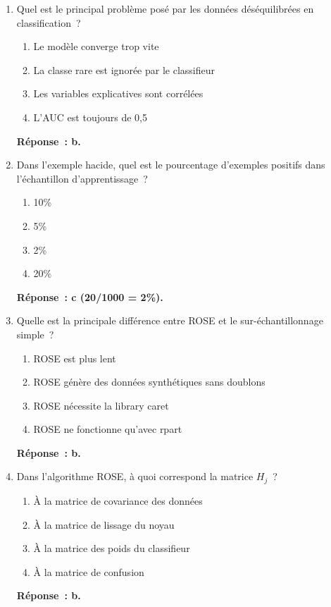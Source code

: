 \documentclass[a4paper,11pt]{article}
\theoremstyle{definition}
\begin{document}
\begin{enumerate}

  \item Quel est le principal probl\`eme pos\'e par les donn\'ees
    d\'es\'equilibr\'ees en classification~?
    \begin{enumerate}
      \item Le mod\`ele converge trop vite
      \item La classe rare est ignor\'ee par le classifieur
      \item Les variables explicatives sont corr\'el\'ees
      \item L'AUC est toujours de 0,5
    \end{enumerate}
    \textbf{R\'eponse~: b.}

  \item Dans l'exemple hacide, quel est le pourcentage d'exemples
    positifs dans l'\'echantillon d'apprentissage~?
    \begin{enumerate}
      \item 10\%
      \item 5\%
      \item 2\%
      \item 20\%
    \end{enumerate}
    \textbf{R\'eponse~: c (20/1000 = 2\%).}

  \item Quelle est la principale diff\'erence entre ROSE et le
    sur-\'echantillonnage simple~?
    \begin{enumerate}
      \item ROSE est plus lent
      \item ROSE g\'en\`ere des donn\'ees synth\'etiques sans
        doublons
      \item ROSE n\'ecessite la library caret
      \item ROSE ne fonctionne qu'avec rpart
    \end{enumerate}
    \textbf{R\'eponse~: b.}

  \item Dans l'algorithme ROSE, \`a quoi correspond la matrice
    $H_j$~?
    \begin{enumerate}
      \item \`A la matrice de covariance des donn\'ees
      \item \`A la matrice de lissage du noyau
      \item \`A la matrice des poids du classifieur
      \item \`A la matrice de confusion
    \end{enumerate}
    \textbf{R\'eponse~: b.}


\end{enumerate}
\end{document}
